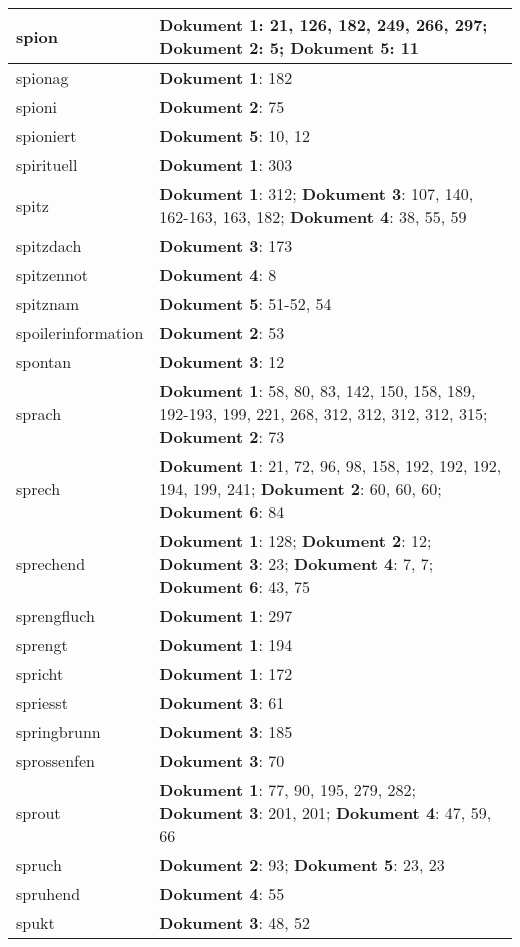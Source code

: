 \documentclass[a5paper]{article}
\begin{document}
\begin{longtable}[l]{|l|p{3in}|}
\hline
spion & \textbf{Dokument 1}: 21, 126, 182, 249, 266, 297; \textbf{Dokument 2}: 5; \textbf{Dokument 5}: 11 \\
\hline
spionag & \textbf{Dokument 1}: 182 \\
\hline
spioni & \textbf{Dokument 2}: 75 \\
\hline
spioniert & \textbf{Dokument 5}: 10, 12 \\
\hline
spirituell & \textbf{Dokument 1}: 303 \\
\hline
spitz & \textbf{Dokument 1}: 312; \textbf{Dokument 3}: 107, 140, 162-163, 163, 182; \textbf{Dokument 4}: 38, 55, 59 \\
\hline
spitzdach & \textbf{Dokument 3}: 173 \\
\hline
spitzennot & \textbf{Dokument 4}: 8 \\
\hline
spitznam & \textbf{Dokument 5}: 51-52, 54 \\
\hline
spoilerinformation & \textbf{Dokument 2}: 53 \\
\hline
spontan & \textbf{Dokument 3}: 12 \\
\hline
sprach & \textbf{Dokument 1}: 58, 80, 83, 142, 150, 158, 189, 192-193, 199, 221, 268, 312, 312, 312, 312, 315; \textbf{Dokument 2}: 73 \\
\hline
sprech & \textbf{Dokument 1}: 21, 72, 96, 98, 158, 192, 192, 192, 194, 199, 241; \textbf{Dokument 2}: 60, 60, 60; \textbf{Dokument 6}: 84 \\
\hline
sprechend & \textbf{Dokument 1}: 128; \textbf{Dokument 2}: 12; \textbf{Dokument 3}: 23; \textbf{Dokument 4}: 7, 7; \textbf{Dokument 6}: 43, 75 \\
\hline
sprengfluch & \textbf{Dokument 1}: 297 \\
\hline
sprengt & \textbf{Dokument 1}: 194 \\
\hline
spricht & \textbf{Dokument 1}: 172 \\
\hline
spriesst & \textbf{Dokument 3}: 61 \\
\hline
springbrunn & \textbf{Dokument 3}: 185 \\
\hline
sprossenfen & \textbf{Dokument 3}: 70 \\
\hline
sprout & \textbf{Dokument 1}: 77, 90, 195, 279, 282; \textbf{Dokument 3}: 201, 201; \textbf{Dokument 4}: 47, 59, 66 \\
\hline
spruch & \textbf{Dokument 2}: 93; \textbf{Dokument 5}: 23, 23 \\
\hline
spruhend & \textbf{Dokument 4}: 55 \\
\hline
spukt & \textbf{Dokument 3}: 48, 52 \\

\end{longtable}
\end{document}
